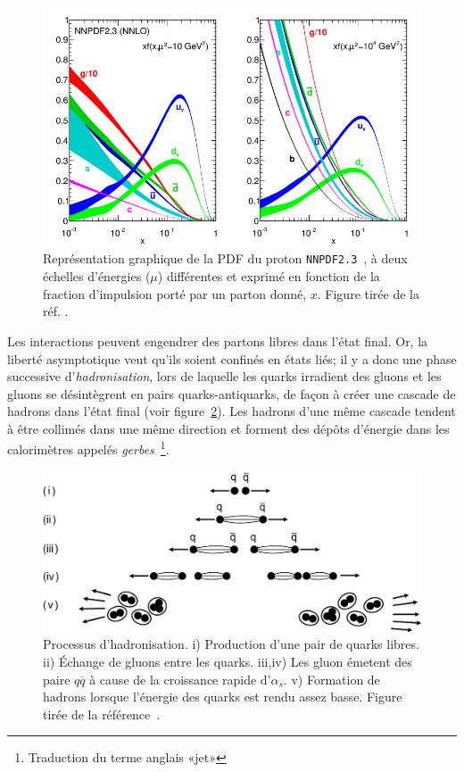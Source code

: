 \begin{figure}
  \centering
  \includegraphics{nnpdf23.pdf}
  \caption{Représentation graphique de la PDF du proton
    \texttt{NNPDF2.3}~\cite{ball_parton_2013}, à deux échelles
    d'énergies ($\mu$) différentes et exprimé en fonction de la
    fraction d'impulsion porté par un parton donné, $x$. Figure tirée de la
    réf. \cite{olive_qcd_2014}.}
  \label{fig:pdf}
\end{figure}

Les interactions peuvent engendrer des partons libres dans l'état
final. Or, la liberté asymptotique veut qu'ils soient confinés en
états liés; il y a donc une phase successive d'\emph{hadronisation},
lors de laquelle les quarks irradient des gluons et les gluons se
désintègrent en pairs quarks-antiquarks, de façon à créer une cascade
de hadrons dans l'état final (voir
figure~\ref{fig:hadronisation}). Les hadrons d'une même cascade
tendent à être collimés dans une même direction et forment des
dépôts d'énergie dans les calorimètres appelés
\emph{gerbes}~\footnote{Traduction du terme anglais
  «jet»}.

\begin{figure}
  \centering
  \includegraphics{hadronisation.jpg}
  \caption{Processus d'hadronisation. i) Production d'une pair de
    quarks libres. ii) Échange de gluons entre les quarks. iii,iv) Les
    gluon émetent des paire $q\overline{q}$ à cause de la croissance
    rapide d'$\alpha_s$. v) Formation de hadrons lorsque l'énergie des
    quarks est rendu assez basse. Figure tirée de la
    référence~\cite{thomson_modern_2013}.}
  \label{fig:hadronisation}
\end{figure}

